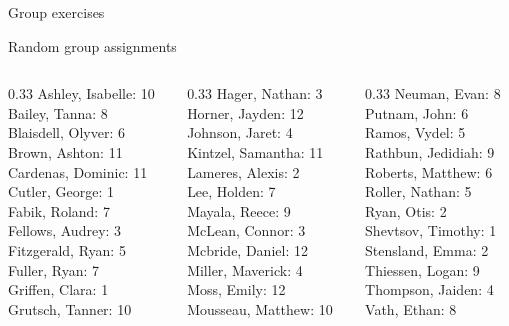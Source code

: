 \documentclass[10pt]{beamer}
\begin{document}
\begin{frame}[standout]
Group exercises
\end{frame}

\begin{frame}{Random group assignments}
\small 
\begin{columns}
\begin{column}{0.33\textwidth}
Ashley, Isabelle: 10 \\ 
Bailey, Tanna: 8 \\ 
Blaisdell, Olyver: 6 \\ 
Brown, Ashton: 11 \\ 
Cardenas, Dominic: 11 \\ 
Cutler, George: 1 \\ 
Fabik, Roland: 7 \\ 
Fellows, Audrey: 3 \\ 
Fitzgerald, Ryan: 5 \\ 
Fuller, Ryan: 7 \\ 
Griffen, Clara: 1 \\ 
Grutsch, Tanner: 10 \\\end{column}
\begin{column}{0.33\textwidth}
Hager, Nathan: 3 \\ 
Horner, Jayden: 12 \\ 
Johnson, Jaret: 4 \\ 
Kintzel, Samantha: 11 \\ 
Lameres, Alexis: 2 \\ 
Lee, Holden: 7 \\ 
Mayala, Reece: 9 \\ 
McLean, Connor: 3 \\ 
Mcbride, Daniel: 12 \\ 
Miller, Maverick: 4 \\ 
Moss, Emily: 12 \\ 
Mousseau, Matthew: 10 \\\end{column}
\begin{column}{0.33\textwidth}
Neuman, Evan: 8 \\ 
Putnam, John: 6 \\ 
Ramos, Vydel: 5 \\ 
Rathbun, Jedidiah: 9 \\ 
Roberts, Matthew: 6 \\ 
Roller, Nathan: 5 \\ 
Ryan, Otis: 2 \\ 
Shevtsov, Timothy: 1 \\ 
Stensland, Emma: 2 \\ 
Thiessen, Logan: 9 \\ 
Thompson, Jaiden: 4 \\ 
Vath, Ethan: 8 \\\end{column}
\end{columns}
\end{frame}
\end{document}
